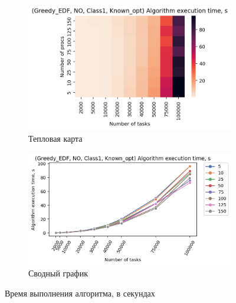 \begin{figure}[!htbp]
    \centering
    \begin{subfigure}{0.49\textwidth}
        \includegraphics[width=\textwidth]{imgs/ideal_1/NO_EDF/et_heatmap.png}
        \caption{Тепловая карта}
        \label{fig:NO-EDF-exec-time-heatmap}
    \end{subfigure}
    \hfill
    \begin{subfigure}{0.49\textwidth}
        \includegraphics[width=\textwidth]{imgs/ideal_1/NO_EDF/tr_graph.png}
        \caption{Сводный график}
        \label{fig:NO-EDF-exec-time-compiled}
    \end{subfigure}
    \caption{Время выполнения алгоритма, в секундах}
\end{figure}

